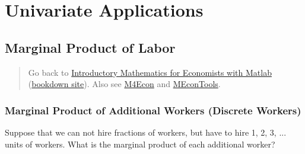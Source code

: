 \documentclass[
]{book}
\begin{document}
\vspace{1em}

\hypertarget{univariate-applications}{%
\chapter{Univariate Applications}\label{univariate-applications}}

\hypertarget{marginal-product-of-labor}{%
\section{Marginal Product of Labor}\label{marginal-product-of-labor}}

\begin{quote}
Go back to \href{https://math4econ.github.io/}{Introductory Mathematics for Economists with Matlab} (\href{https://math4econ.github.io/bookdown}{bookdown site}). Also see \href{http://fanwangecon.github.io/M4Econ}{M4Econ} and \href{https://fanwangecon.github.io/MEconTools/}{MEconTools}.
\end{quote}

\hypertarget{marginal-product-of-additional-workers-discrete-workers}{%
\subsection{Marginal Product of Additional Workers (Discrete Workers)}\label{marginal-product-of-additional-workers-discrete-workers}}

Suppose that we can not hire fractions of workers, but have to hire 1,
2, 3, ... units of workers. What is the marginal product of each
additional worker?
\end{document}
